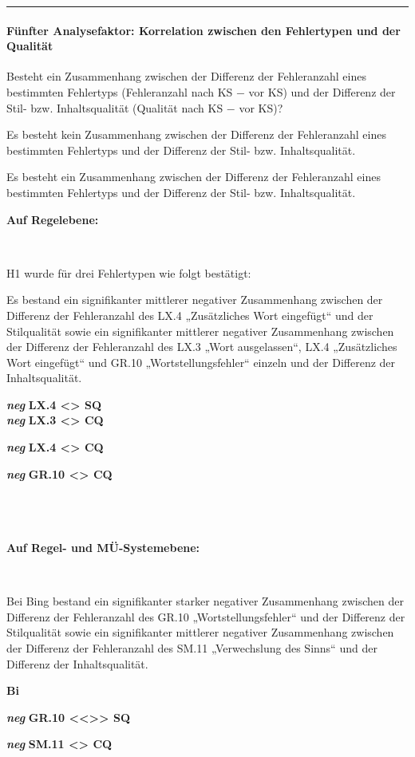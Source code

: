 \hrule
\paragraph*{Fünfter Analysefaktor: Korrelation zwischen den Fehlertypen und der Qualität}
\begin{description}[font=\normalfont\bfseries]
\item [Fragestellung:] Besteht ein Zusammenhang zwischen der Differenz der Fehleranzahl eines bestimmten Fehlertyps (Fehleranzahl nach KS $-$ vor KS) und der Differenz der Stil- bzw. Inhaltsqualität (Qualität nach KS $-$ vor KS)?
\item [H0 --] Es besteht kein Zusammenhang zwischen der Differenz der Fehleranzahl eines bestimmten Fehlertyps und der Differenz der Stil- bzw. Inhaltsqualität.
\item [H1 --] Es besteht ein Zusammenhang zwischen der Differenz der Fehleranzahl eines bestimmten Fehlertyps und der Differenz der Stil- bzw. Inhaltsqualität.
\item [Resultat]
\end{description}
\noindent
\parbox[t]{.7\textwidth}{\textbf{Auf Regelebene:}}\\
\parbox[t]{.7\textwidth}{
H1 wurde für drei Fehlertypen wie folgt bestätigt:

Es bestand ein signifikanter mittlerer negativer Zusammenhang zwischen der Differenz der Fehleranzahl des LX.4 „Zusätzliches Wort eingefügt“ und der Stilqualität sowie ein signifikanter mittlerer negativer Zusammenhang zwischen der Differenz der Fehleranzahl des LX.3 „Wort ausgelassen“, LX.4 „Zusätzliches Wort eingefügt“ und GR.10 „Wortstellungsfehler“ einzeln und der Differenz der Inhaltsqualität.
}
\parbox[t]{.04\textwidth}{}
\colorbox{smGreen}{\parbox[t]{.25\textwidth}{
{ \textbf{\textit{neg}} \textbf{LX.4 <> SQ}}\\

{ \textbf{\textit{neg}} \textbf{LX.3 <> CQ}}

{ \textbf{\textit{neg}} \textbf{LX.4 <> CQ}}

 \textbf{\textit{neg}} \textbf{GR.10 <> CQ}\\
 \\
 \\
 \\
}}

\noindent
\parbox[t]{.7\textwidth}{\textbf{Auf Regel- und MÜ-Systemebene:}}\\
\parbox[t]{.7\textwidth}{
Bei Bing bestand ein signifikanter starker negativer Zusammenhang zwischen der Differenz der Fehleranzahl des GR.10 „Wortstellungsfehler“ und der Differenz der Stilqualität sowie ein signifikanter mittlerer negativer Zusammenhang zwischen der Differenz der Fehleranzahl des SM.11 „Verwechslung des Sinns“ und der Differenz der Inhaltsqualität.
}
\parbox[t]{.04\textwidth}{}
\colorbox{smGreen}{\parbox[t]{.25\textwidth}{
{ \textbf{Bi}}

{ \textbf{\textit{neg}} \textbf{GR.10 <{}<{}>{}> SQ}}

 \textbf{\textit{neg}} \textbf{SM.11 <> CQ}\\
 \\
 \\
 \\
}}

